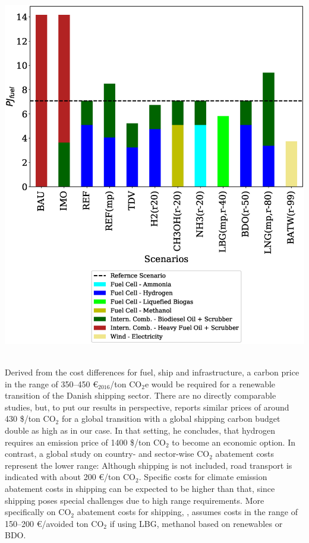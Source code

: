 \documentclass[article]{elsarticle}
\begin{document}
\begin{minipage}[t]{0.49\textwidth}
    \centering
    \captionsetup{justification=centering}
    \includegraphics[width=.95\textwidth]{figures/AllFuel2050.eps}
    \label{fig:AllFuel2050}
\end{minipage}\\[0.75cm]

Derived from the cost differences for fuel, ship and infrastructure, a carbon price in the range of 350--450 \euro$_{2016}$/ton CO$_2$e would be required for a renewable transition of the Danish shipping sector. There are no directly comparable studies, but, to put our results in perspective, \citep[p.197]{Raucci2017} reports similar prices of around 430 \$/ton CO$_2$ for a global transition with a global shipping carbon budget double as high as in our case. In that setting, he concludes, that hydrogen requires an emission price of 1400 \$/ton CO$_2$ to become an economic option. In contrast, a global study on country- and sector-wise CO$_2$ abatement costs \cite{OECD2016} represent the lower range: Although shipping is not included, road transport is indicated with about 200 \euro/ton CO$_2$. Specific costs for climate emission abatement costs in shipping can be expected to be higher than that, since shipping poses special challenges due to high range requirements. More specifically on CO$_2$ abatement costs for shipping, \citet{DNVGL2017}, assumes costs in the range of 150--200 \euro/avoided ton CO$_2$ if using LBG, methanol based on renewables or BDO.
\end{document}
